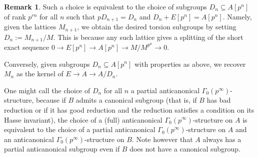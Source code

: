 \documentclass[10pt,oneside]{amsart}
\theoremstyle{definition}
\newtheorem{remark}[theorem]{Remark}
\begin{document}
	\begin{remark}\label{remark: Definition of the D_n}
		Such a choice is equivalent to the choice of subgroups $D_n\subseteq A[p^n]$ of rank $p^{rn}$ for all $n$ such that $pD_{n+1}=D_n$ and $D_n+E[p^n]=A[p^n]$. Namely,
		given the lattices $M_{n+1}$, we obtain the desired torsion subgroups by setting $D_n:=M_{n+1}/M$. This is because any such lattice gives a splitting of the short exact sequence $0\rightarrow E[p^n]\rightarrow A[p^n]\rightarrow M/M^{p^n} \rightarrow 0$.
		
		Conversely, given subgroups $D_n\subseteq A[p^n]$ with properties as above, we recover $M_n$ as the kernel of $E\rightarrow A\rightarrow A/D_n$.
		
		One might call the choice of $D_n$ for all $n$ a partial anticanonical $\Gamma_0(p^\infty)$-structure, because if $B$ admits a canonical subgroup (that is, if $B$ has bad reduction or if it has good reduction and the reduction satisfies a condition on its Hasse invariant), the choice of a (full) anticanonical $\Gamma_0(p^\infty)$-structure on $A$ is equivalent to the choice of a partial anticanonical $\Gamma_0(p^\infty)$-structure on $A$ and an anticanonical $\Gamma_0(p^\infty)$-structure on $B$. Note however that $A$ always has a partial anticanonical subgroup even if $B$ does not have a canonical subgroup.
	\end{remark}
	
\end{document}
